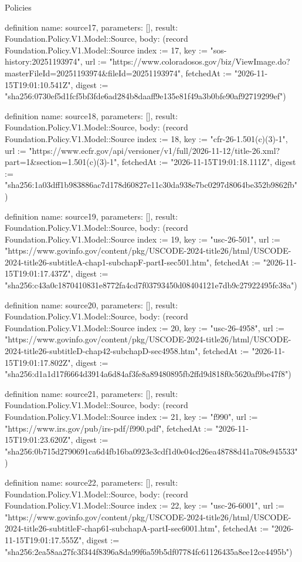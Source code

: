 \begin{lexlean}{Policies}
\begin{semanticmodule}
definition{
  name: source17,
  parameters: [],
  result: Foundation.Policy.V1.Model::Source,
  body: (record Foundation.Policy.V1.Model::Source {index := 17, key := "sos-history:20251193974", url := "https://www.coloradosos.gov/biz/ViewImage.do?masterFileId=20251193974&fileId=20251193974", fetchedAt := "2026-11-15T19:01:10.541Z", digest := "sha256:0730ef5d1fcf5bf3fde6ad284b8daaff9e135e81f49a3b0bfe90af92719299ef"})
}

definition{
  name: source18,
  parameters: [],
  result: Foundation.Policy.V1.Model::Source,
  body: (record Foundation.Policy.V1.Model::Source {index := 18, key := "cfr-26-1.501(c)(3)-1", url := "https://www.ecfr.gov/api/versioner/v1/full/2026-11-12/title-26.xml?part=1&section=1.501(c)(3)-1", fetchedAt := "2026-11-15T19:01:18.111Z", digest := "sha256:1a03dff1b983886ac7d178d60827e11c30da938e7bc0297d8064be352b9862fb"})
}

definition{
  name: source19,
  parameters: [],
  result: Foundation.Policy.V1.Model::Source,
  body: (record Foundation.Policy.V1.Model::Source {index := 19, key := "usc-26-501", url := "https://www.govinfo.gov/content/pkg/USCODE-2024-title26/html/USCODE-2024-title26-subtitleA-chap1-subchapF-partI-sec501.htm", fetchedAt := "2026-11-15T19:01:17.437Z", digest := "sha256:c43a0c1870410831e8772fa4cd7f03793450d08404121e7db9c27922495fc38a"})
}

definition{
  name: source20,
  parameters: [],
  result: Foundation.Policy.V1.Model::Source,
  body: (record Foundation.Policy.V1.Model::Source {index := 20, key := "usc-26-4958", url := "https://www.govinfo.gov/content/pkg/USCODE-2024-title26/html/USCODE-2024-title26-subtitleD-chap42-subchapD-sec4958.htm", fetchedAt := "2026-11-15T19:01:17.802Z", digest := "sha256:d1a1d17f6664d3914a6d84af3fe8a89480895fb2ffd9d818f0c5620af9be47f8"})
}

definition{
  name: source21,
  parameters: [],
  result: Foundation.Policy.V1.Model::Source,
  body: (record Foundation.Policy.V1.Model::Source {index := 21, key := "f990", url := "https://www.irs.gov/pub/irs-pdf/f990.pdf", fetchedAt := "2026-11-15T19:01:23.620Z", digest := "sha256:0b715d2790691ca6d4fb16ba0923e3cdf1d0e04cd26ea48788d41a708e945533"})
}

definition{
  name: source22,
  parameters: [],
  result: Foundation.Policy.V1.Model::Source,
  body: (record Foundation.Policy.V1.Model::Source {index := 22, key := "usc-26-6001", url := "https://www.govinfo.gov/content/pkg/USCODE-2024-title26/html/USCODE-2024-title26-subtitleF-chap61-subchapA-partI-sec6001.htm", fetchedAt := "2026-11-15T19:01:17.555Z", digest := "sha256:2ea58aa27fc3f344f8396a8da99f6a59b5df07784fc61126435a8ee12ce4495b"})
}


\end{semanticmodule}
\end{lexlean}
